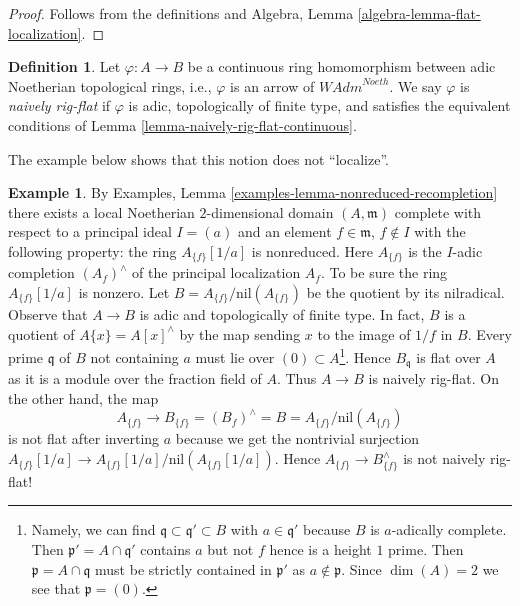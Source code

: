\documentclass{stacks-project}
\theoremstyle{plain}
\theoremstyle{definition}
\newtheorem{definition}[subsection]{Definition}
\newtheorem{example}[subsection]{Example}
\theoremstyle{remark}
\numberwithin{equation}{subsection}
\begin{document}
\begin{proof}
Follows from the definitions and
Algebra, Lemma \ref{algebra-lemma-flat-localization}.
\end{proof}

\begin{definition}
\label{definition-naively-rig-flat}
Let $\varphi : A \to B$ be a continuous ring homomorphism
between adic Noetherian topological rings, i.e., $\varphi$
is an arrow of $\textit{WAdm}^{Noeth}$. We say $\varphi$ is
{\it naively rig-flat} if $\varphi$ is adic, topologically
of finite type, and satisfies the equivalent conditions of
Lemma \ref{lemma-naively-rig-flat-continuous}.
\end{definition}

\noindent
The example below shows that this notion does not ``localize''.

\begin{example}
\label{example-recompletion-not-rig-flat}
By Examples, Lemma \ref{examples-lemma-nonreduced-recompletion}
there exists a local Noetherian $2$-dimensional domain $(A, \mathfrak m)$
complete with respect to a principal ideal $I = (a)$ and an
element $f \in \mathfrak m$, $f \not \in I$ with the following
property: the ring $A_{\{f\}}[1/a]$ is nonreduced.
Here $A_{\{f\}}$ is the $I$-adic completion $(A_f)^\wedge$ of the principal
localization $A_f$. To be sure the ring $A_{\{f\}}[1/a]$ is nonzero.
Let $B = A_{\{f\}}/ \text{nil}(A_{\{f\}})$ be the quotient
by its nilradical. Observe that $A \to B$ is adic and
topologically of finite type.
In fact, $B$ is a quotient of $A\{x\} = A[x]^\wedge$ by the
map sending $x$ to the image of $1/f$ in $B$.
Every prime $\mathfrak q$ of $B$ not containing $a$ must
lie over $(0) \subset A$\footnote{Namely, we can find
$\mathfrak q \subset \mathfrak q' \subset B$ with $a \in \mathfrak q'$
because $B$ is $a$-adically complete. Then $\mathfrak p' = A \cap \mathfrak q'$
contains $a$ but not $f$ hence is a height $1$ prime. Then
$\mathfrak p = A \cap \mathfrak q$ must be strictly
contained in $\mathfrak p'$ as $a \not \in \mathfrak p$. Since
$\dim(A) = 2$ we see that $\mathfrak p = (0)$.}. Hence $B_\mathfrak q$
is flat over $A$ as it is a module over the
fraction field of $A$. Thus $A \to B$ is naively rig-flat.
On the other hand, the map
$$
A_{\{f\}}
\longrightarrow
B_{\{f\}} = (B_f)^\wedge = B = A_{\{f\}} /\text{nil}(A_{\{f\}})
$$
is not flat after inverting $a$ because we get the nontrivial surjection
$A_{\{f\}}[1/a] \to A_{\{f\}}[1/a]/\text{nil}(A_{\{f\}}[1/a])$.
Hence $A_{\{f\}} \to B_{\{f\}}^\wedge$ is not naively rig-flat!
\end{example}
\end{document}
